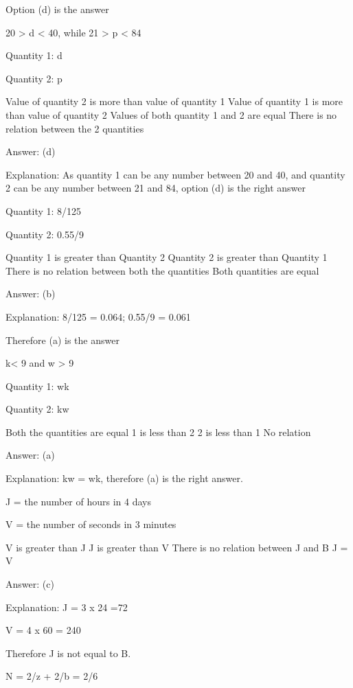     Option (d) is the answer

    20 > d < 40, while 21 > p < 84

    Quantity 1: d

    Quantity 2: p

        Value of quantity 2 is more than value of quantity 1
        Value of quantity 1 is more than value of quantity 2
        Values of both quantity 1 and 2 are equal
        There is no relation between the 2 quantities

    Answer: (d)

    Explanation: As quantity 1 can be any number between 20 and 40, and quantity 2 can be any number between 21 and 84, option (d) is the right answer

    Quantity 1: 8/125

    Quantity 2: 0.55/9

        Quantity 1 is greater than Quantity 2
        Quantity 2 is greater than Quantity 1
        There is no relation between both the quantities
        Both quantities are equal

    Answer: (b)

    Explanation: 8/125 = 0.064; 0.55/9 = 0.061

    Therefore (a) is the answer 






    k< 9 and w > 9

    Quantity 1: wk

    Quantity 2: kw

        Both the quantities are equal
        1 is less than 2
        2 is less than 1
        No relation

    Answer: (a)

    Explanation: kw = wk, therefore (a) is the right answer.

    J = the number of hours in 4 days

    V = the number of seconds in 3 minutes

        V is greater than J
        J is greater than V
        There is no relation between J and B
        J = V

    Answer: (c)

    Explanation: J = 3 x 24 =72

    V = 4 x 60 = 240

    Therefore J is not equal to B.

    N = 2/z + 2/b = 2/6


